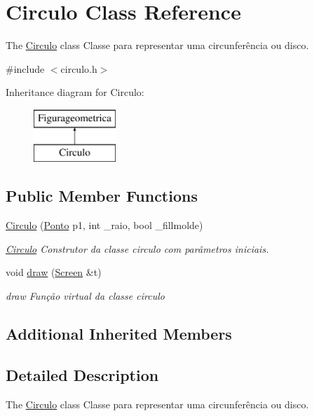 \hypertarget{class_circulo}{}\section{Circulo Class Reference}
\label{class_circulo}


The \mbox{\hyperlink{class_circulo}{Circulo}} class Classe para representar uma circunferência ou disco.  




{\ttfamily \#include $<$circulo.\+h$>$}

Inheritance diagram for Circulo\+:\begin{figure}[H]
\begin{center}
\leavevmode
\includegraphics[height=2.000000cm]{class_circulo}
\end{center}
\end{figure}
\subsection*{Public Member Functions}
\begin{DoxyCompactItemize}
\item 
\mbox{\hyperlink{class_circulo_a0773937be6980f57837cb406d7553df8}{Circulo}} (\mbox{\hyperlink{class_ponto}{Ponto}} p1, int \+\_\+raio, bool \+\_\+fillmolde)
\begin{DoxyCompactList}\small\item\em \mbox{\hyperlink{class_circulo}{Circulo}} Construtor da classe circulo com parâmetros iniciais. \end{DoxyCompactList}\item 
void \mbox{\hyperlink{class_circulo_a593787d6e0618c2eded23e8839e7bea6}{draw}} (\mbox{\hyperlink{class_screen}{Screen}} \&t)
\begin{DoxyCompactList}\small\item\em draw Função virtual da classe circulo \end{DoxyCompactList}\end{DoxyCompactItemize}
\subsection*{Additional Inherited Members}


\subsection{Detailed Description}
The \mbox{\hyperlink{class_circulo}{Circulo}} class Classe para representar uma circunferência ou disco. 

